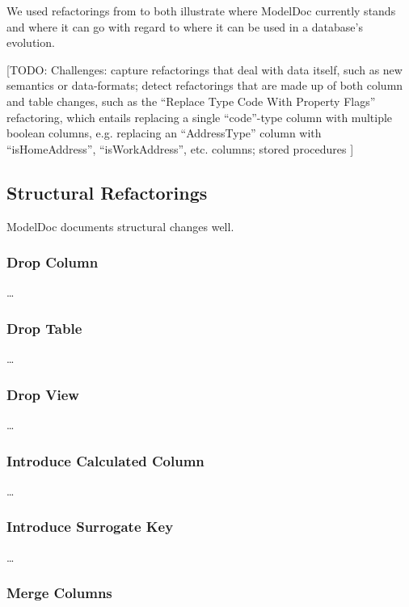 \documentclass{acm_proc_article-sp}
\begin{document}
We used refactorings from \cite{ambler:refactoring} to both illustrate where
ModelDoc currently stands and where it can go with regard to where it can be
used in a database's evolution.

[TODO: Challenges: capture refactorings that deal with data itself, such as new
semantics or data-formats;  detect refactorings that
are made up of both column and table changes, such as the ``Replace Type Code
With Property Flags'' refactoring, which entails replacing a single
``code''-type column with multiple boolean columns, e.g. replacing an
``AddressType'' column with ``isHomeAddress'', ``isWorkAddress'', etc. columns;
  stored procedures ]

\subsection{Structural Refactorings}

ModelDoc documents structural changes well.

\subsubsection{Drop Column}

\ldots

\subsubsection{Drop Table}

\ldots

\subsubsection{Drop View}

\ldots

\subsubsection{Introduce Calculated Column}

\ldots

\subsubsection{Introduce Surrogate Key}

\ldots

\subsubsection{Merge Columns}
\end{document}
